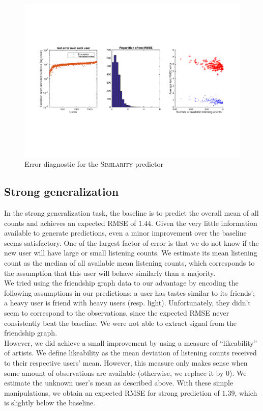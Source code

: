 \documentclass[10pt,a4paper]{article}
\begin{document}
    \begin{figure}[ht]
      \center
        \includegraphics[width=12cm]{figures/recommendation/similarity-predictor-plots.pdf}
      \caption{Error diagnostic for the \textsc{Similarity} predictor}
      \label{fig:similarity-predictor-plots}
    \end{figure}


  \subsection{Strong generalization}
  In the strong generalization task, the baseline is to predict the overall mean of all counts and achieves an expected RMSE of $1.44$. Given the very little information available to generate predictions, even a minor improvement over the baseline seems satisfactory. One of the largest factor of error is that we do not know if the new user will have large or small listening counts. We estimate its mean listening count as the median of all available mean listening counts, which corresponds to the assumption that this user will behave similarly than a majority.\\
  We tried using the friendship graph data to our advantage by encoding the following assumptions in our predictions: a user has tastes similar to its friends'; a heavy user is friend with heavy users (resp. light). Unfortunately, they didn't seem to correspond to the observations, since the expected RMSE never consistently beat the baseline. We were not able to extract signal from the friendship graph.\\
  However, we did achieve a small improvement by using a measure of ``likeability'' of artists. We define likeability as the mean deviation of listening counts received to their respective users' mean. However, this measure only makes sense when some amount of observations are available (otherwise, we replace it by $0$). We estimate the unknown user's mean as described above. With these simple manipulations, we obtain an expected RMSE for strong prediction of $1.39$, which is slightly below the baseline.
\end{document}
